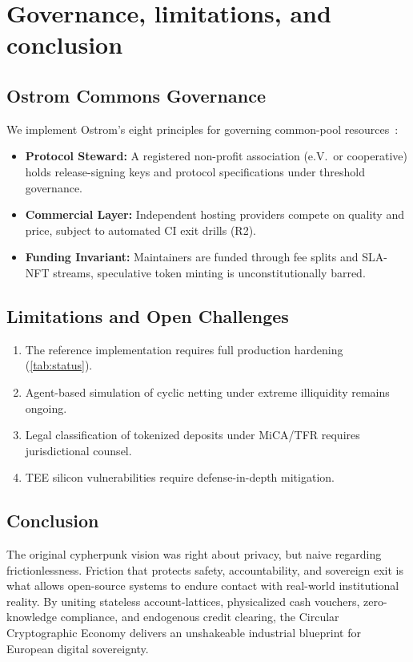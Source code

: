 \documentclass[a4paper,11pt,twoside,parskip=half-,headings=small]{scrartcl}
\begin{document}
\section{Governance, limitations, and conclusion}
\label{sec:gov}

\subsection{Ostrom Commons Governance}

We implement Ostrom's eight principles for governing common-pool resources~\cite{ostrom1990}:
\begin{itemize}
  \item \textbf{Protocol Steward:} A registered non-profit association (e.V.\ or cooperative)
holds release-signing keys and protocol specifications under threshold governance.
  \item \textbf{Commercial Layer:} Independent hosting providers compete on quality and price,
subject to automated CI exit drills (R2).
  \item \textbf{Funding Invariant:} Maintainers are funded through fee splits and SLA-NFT streams,
speculative token minting is unconstitutionally barred.
\end{itemize}

\subsection{Limitations and Open Challenges}
\begin{enumerate}
  \item The reference implementation requires full production hardening (\cref{tab:status}).
  \item Agent-based simulation of cyclic netting under extreme illiquidity remains ongoing.
  \item Legal classification of tokenized deposits under MiCA/TFR requires jurisdictional counsel.
  \item TEE silicon vulnerabilities require defense-in-depth mitigation.
\end{enumerate}

\subsection{Conclusion}

The original cypherpunk vision was right about privacy, but naive regarding frictionlessness.
Friction that protects safety, accountability, and sovereign exit is what allows open-source
systems to endure contact with real-world institutional reality. By uniting stateless
account-lattices, physicalized cash vouchers, zero-knowledge compliance, and endogenous
credit clearing, the Circular Cryptographic Economy delivers an unshakeable industrial
blueprint for European digital sovereignty.
\end{document}
